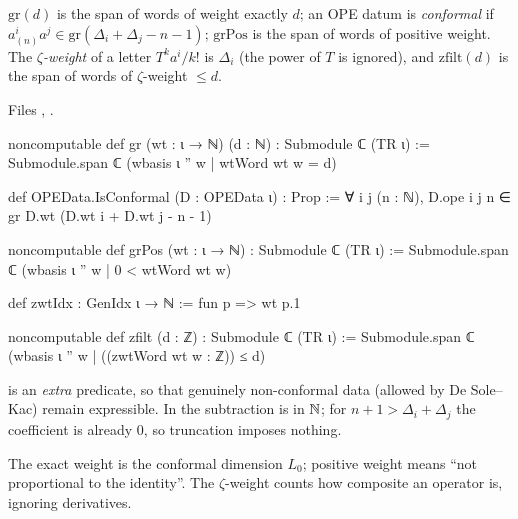 \begin{definition}\label{l11:def:gr}
$\mathrm{gr}(d)$ is the span of words of weight exactly $d$; an OPE datum is \emph{conformal} if $a^i_{(n)}a^j\in\mathrm{gr}(\Delta_i+\Delta_j-n-1)$;
$\mathrm{grPos}$ is the span of words of positive weight. The \emph{$\zeta$-weight} of a letter $T^ka^i/k!$ is $\Delta_i$ (the power of $T$ is
ignored), and $\mathrm{zfilt}(d)$ is the span of words of $\zeta$-weight $\le d$.
\end{definition}
\noindent Files , .
\begin{leancode}
noncomputable def gr (wt : ι → ℕ) (d : ℕ) : Submodule ℂ (TR ι) :=
  Submodule.span ℂ (wbasis ι '' {w | wtWord wt w = d})

def OPEData.IsConformal (D : OPEData ι) : Prop :=
  ∀ i j (n : ℕ), D.ope i j n ∈ gr D.wt (D.wt i + D.wt j - n - 1)

noncomputable def grPos (wt : ι → ℕ) : Submodule ℂ (TR ι) :=
  Submodule.span ℂ (wbasis ι '' {w | 0 < wtWord wt w})

def zwtIdx : GenIdx ι → ℕ := fun p => wt p.1

noncomputable def zfilt (d : ℤ) : Submodule ℂ (TR ι) :=
  Submodule.span ℂ (wbasis ι '' {w | ((zwtWord wt w : ℤ)) ≤ d})
\end{leancode}

\begin{dictionary}
 is an \emph{extra} predicate, so that genuinely non-conformal data (allowed by De Sole--Kac) remain expressible.
In  the subtraction is in ${\mathbb{N}}$; for $n+1>\Delta_i+\Delta_j$ the coefficient is already $0$, so truncation imposes nothing.
\end{dictionary}

\begin{physics}
The exact weight is the conformal dimension $L_0$; positive weight means ``not proportional to the identity''. The $\zeta$-weight counts
how composite an operator is, ignoring derivatives.
\end{physics}


